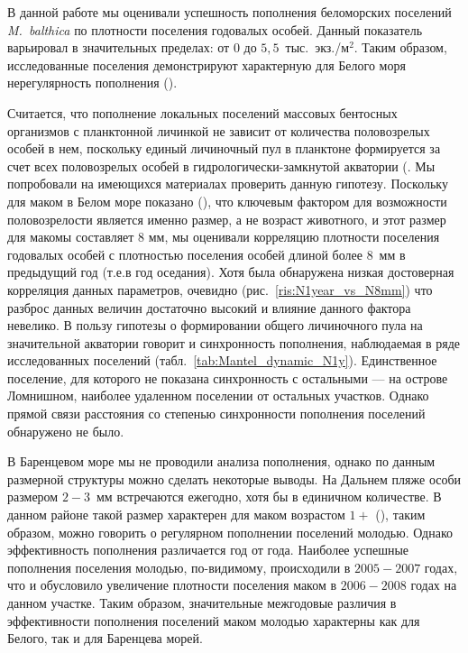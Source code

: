 \par\bigskip
В данной работе мы оценивали успешность пополнения беломорских поселений \textit{M.~balthica} по плотности поселения годовалых особей.
Данный показатель варьировал в значительных пределах: от $0$ до $5,5$~тыс.~экз./м$^2$.
Таким образом, исследованные поселения демонстрируют характерную для Белого моря нерегулярность пополнения (\cite{Maximovich_et_al_1991, Maximovich_Gerasimova_2004, Gerasimova_Maximovich_2009}).

Считается, что пополнение локальных поселений массовых бентосных организмов с планктонной личинкой не зависит от количества половозрелых особей в нем, поскольку единый личиночный пул в планктоне формируется за счет всех половозрелых особей в гидрологически-замкнутой акватории (\cite{Maximovich_Shilin_2012}.
Мы попробовали на имеющихся материалах проверить данную гипотезу.
Поскольку для маком в Белом море показано (\cite{Semenova_1980, Maximovich_1985}), что ключевым фактором для возможности половозрелости является именно размер, а не возраст животного, и этот размер для макомы составляет 8 мм, мы оценивали корреляцию плотности поселения годовалых особей с плотностью поселения особей длиной более $8$~мм в предыдущий год (т.е.в год оседания).
Хотя была обнаружена низкая достоверная корреляция данных параметров, очевидно (рис.~\ref{ris:N1year_vs_N8mm}) что разброс данных величин достаточно высокий и влияние данного фактора невелико.
В пользу гипотезы о формировании общего личиночного пула на значительной акватории говорит и синхронность пополнения, наблюдаемая в ряде исследованных поселений (табл.~\ref{tab:Mantel_dynamic_N1y}).
Единственное поселение, для которого не показана синхронность с остальными --- на острове Ломнишном, наиболее удаленном поселении от остальных участков.
Однако прямой связи расстояния со степенью синхронности пополнения поселений обнаружено не было.

В Баренцевом море мы не проводили анализа пополнения, однако по данным размерной структуры можно сделать некоторые выводы.
На Дальнем пляже особи размером $2-3$~мм встречаются ежегодно, хотя бы в единичном количестве.
В данном районе такой размер характерен для маком возрастом $1+$ (\cite{Nazarova_et_al_2010}), таким образом, можно говорить о регулярном пополнении поселений молодью. 
Однако эффективность пополнения различается год от года. 
Наиболее успешные пополнения поселения молодью, по-видимому, происходили в $2005-2007$ годах, что и обусловило увеличение плотности поселения маком в $2006-2008$ годах на данном участке.
Таким образом, значительные межгодовые различия в эффективности пополнения поселений маком молодью характерны как для Белого, так и для Баренцева морей.

